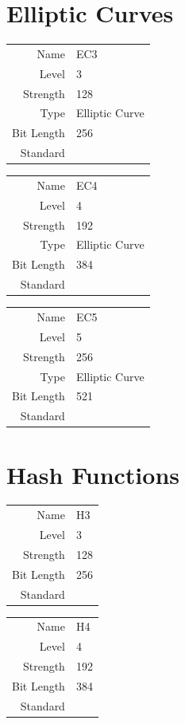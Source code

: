 \documentclass[bibtotoc,halfparskip,oneside]{scrreprt}
\begin{document}
\section{Elliptic Curves}

\begin{tabularx}{\textwidth}{rX}
Name & \textsf{EC3} \\
Level & 3 \\
Strength & 128 \\
Type & Elliptic Curve \\
Bit Length & 256 \\
Standard & 
\end{tabularx}

\begin{tabularx}{\textwidth}{rX}
Name & \textsf{EC4} \\
Level & 4 \\
Strength & 192 \\
Type & Elliptic Curve \\
Bit Length & 384 \\
Standard & 
\end{tabularx}

\begin{tabularx}{\textwidth}{rX}
Name & \textsf{EC5} \\
Level & 5 \\
Strength & 256 \\
Type & Elliptic Curve \\
Bit Length & 521 \\
Standard & 
\end{tabularx}


\section{Hash Functions}

\begin{tabularx}{\textwidth}{rX}
Name & \textsf{H3} \\
Level & 3 \\
Strength & 128 \\
Bit Length & 256 \\
Standard & 
\end{tabularx}

\begin{tabularx}{\textwidth}{rX}
Name & \textsf{H4} \\
Level & 4 \\
Strength & 192 \\
Bit Length & 384 \\
Standard & 
\end{tabularx}
\end{document}

